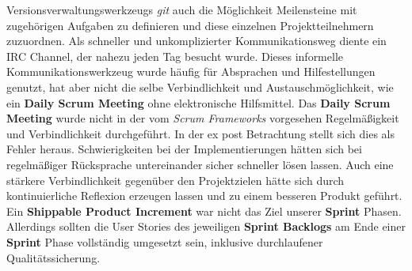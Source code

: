 Versionsverwaltungswerkzeugs \textit{git} auch die Möglichkeit Meilensteine mit zugehörigen Aufgaben zu definieren und diese einzelnen
Projektteilnehmern zuzuordnen. Als schneller und unkomplizierter Kommunikationsweg diente ein IRC Channel, der nahezu jeden Tag besucht wurde. Dieses informelle Kommunikationswerkzeug wurde häufig für Absprachen und Hilfestellungen genutzt, hat aber nicht die selbe Verbindlichkeit und Austauschmöglichkeit, wie ein \textbf{Daily Scrum Meeting} ohne elektronische Hilfsmittel. Das \textbf{Daily Scrum Meeting} wurde nicht in der vom \textit{Scrum Frameworks} vorgesehen Regelmäßigkeit und Verbindlichkeit durchgeführt. In der ex post Betrachtung stellt sich dies als Fehler heraus. Schwierigkeiten bei der Implementierungen hätten sich
bei regelmäßiger Rücksprache untereinander sicher schneller lösen lassen. Auch eine stärkere Verbindlichkeit gegenüber den Projektzielen hätte sich
durch kontinuierliche Reflexion erzeugen lassen und zu einem besseren Produkt geführt.\\
Ein \textbf{Shippable Product Increment} war nicht das Ziel unserer \textbf{Sprint} Phasen. Allerdings sollten die User Stories des jeweiligen \textbf{Sprint Backlogs} am Ende einer \textbf{Sprint} Phase vollständig umgesetzt sein, inklusive durchlaufener Qualitätssicherung.  
